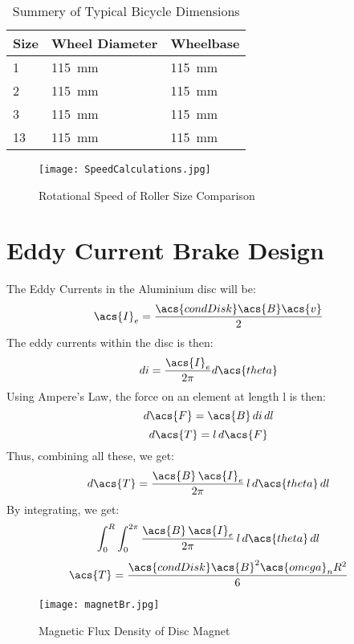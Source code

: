 \begin{table}[H]
	\color{red} %
	\renewcommand{\arraystretch}{1.2}
	\centering
	\caption{Summery of Typical Bicycle Dimensions}
	\begin{tabularx}{\textwidth}{p{1.4cm} >{\raggedright}p{5cm} >{\raggedright\arraybackslash}X}
		\toprule
		Size & Wheel Diameter         & Wheelbase              \\
		\midrule
		1    & \SI{115}{\milli\meter} & \SI{115}{\milli\meter} \\
		2    & \SI{115}{\milli\meter} & \SI{115}{\milli\meter} \\
		3    & \SI{115}{\milli\meter} & \SI{115}{\milli\meter} \\
		13   & \SI{115}{\milli\meter} & \SI{115}{\milli\meter} \\
		\bottomrule
	\end{tabularx}
	\label{tab:bikesize}
\end{table}

\begin{figure}[H]
	\begin{center}
		\texttt{[image: SpeedCalculations.jpg]}
		\caption{Rotational Speed of Roller Size Comparison}
		\label{fig:speedCalc}
	\end{center}
\end{figure}

\color{black}
\newpage

\section{Eddy Current Brake Design}
\color{red} %

The Eddy Currents in the Aluminium disc will be:
\[
	\acs{I}_e = \frac{\acs{condDisk} \acs{B} \acs{v}}{2}
\]
The eddy currents within the disc is then:
\[
	di = \frac{\acs{I}_e}{2 \pi} d\acs{theta}
\]
Using Ampere's Law, the force on an element at length l is then:
\[
	d\acs{F} = \acs{B} \, di \, dl
\]
\[
	d\acs{T} = l \, d\acs{F}
\]
Thus, combining all these, we get:
\[
	d\acs{T} = \frac{\acs{B} \, \acs{I}_e}{2 \pi} \, l \, d\acs{theta} \, dl
\]
By integrating, we get:
\[
	\int_{0}^{R} \int_{0}^{2 \pi} \frac{\acs{B} \, \acs{I}_e}{2 \pi} \, l \, d\acs{theta} \, dl
\]
\[
	\acs{T} = \frac{\acs{condDisk}\acs{B}^2\acs{omega}_n R^2}{6}
\]

\color{black}


\begin{figure}[H]
	\begin{center}
		\texttt{[image: magnetBr.jpg]}
		\caption{Magnetic Flux Density of Disc Magnet}
		\citep[Addapted from][]{Supermagnete:2010}
		\label{fig:B0}
	\end{center}
\end{figure}

